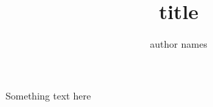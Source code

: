 \documentclass[10pt]{beamer}
\title{title}
\author{author names}
\begin{document}
\begin{frame}
 Something text here
\end{frame}
\end{document}
